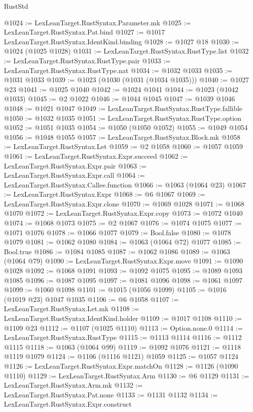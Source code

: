 \begin{lexlean}{RustStd}
\begin{coremodule}
@1024 := LexLeanTarget.RustSyntax.Parameter.mk
@1025 := LexLeanTarget.RustSyntax.Pat.bind
@1027 := @1017 LexLeanTarget.RustSyntax.IdentKind.binding
@1028 := @1027 @18
@1030 := @1024 (@1025 @1028)
@1031 := LexLeanTarget.RustSyntax.RustType.list
@1032 := LexLeanTarget.RustSyntax.RustType.pair
@1033 := LexLeanTarget.RustSyntax.RustType.nat
@1034 := @1032 @1033
@1035 := @1031 @1033
@1039 := @1023 (@1030 (@1031 (@1034 @1035)))
@1040 := @1027 @23
@1041 := @1025 @1040
@1042 := @1024 @1041
@1044 := @1023 (@1042 @1033)
@1045 := @2 @1022
@1046 := @1044 @1045
@1047 := @1039 @1046
@1048 := @1021 @1047
@1049 := LexLeanTarget.RustSyntax.RustType.fallible
@1050 := @1032 @1035
@1051 := LexLeanTarget.RustSyntax.RustType.option
@1052 := @1051 @1035
@1054 := @1050 (@1050 @1052)
@1055 := @1049 @1054
@1056 := @1048 @1055
@1057 := LexLeanTarget.RustSyntax.Block.mk
@1058 := LexLeanTarget.RustSyntax.Let
@1059 := @2 @1058
@1060 := @1057 @1059
@1061 := LexLeanTarget.RustSyntax.Expr.succeed
@1062 := LexLeanTarget.RustSyntax.Expr.pair
@1063 := LexLeanTarget.RustSyntax.Expr.call
@1064 := LexLeanTarget.RustSyntax.Callee.function
@1066 := @1063 (@1064 @23)
@1067 := LexLeanTarget.RustSyntax.Expr
@1068 := @6 @1067
@1069 := LexLeanTarget.RustSyntax.Expr.clone
@1070 := @1069 @1028
@1071 := @1068 @1070
@1072 := LexLeanTarget.RustSyntax.Expr.copy
@1073 := @1072 @1040
@1074 := @1068 @1073
@1075 := @2 @1067
@1076 := @1074 @1075
@1077 := @1071 @1076
@1078 := @1066 @1077
@1079 := Bool.false
@1080 := @1078 @1079
@1081 := @1062 @1080
@1084 := @1063 (@1064 @72) @1077
@1085 := Bool.true
@1086 := @1084 @1085
@1087 := @1062 @1086
@1089 := @1063 (@1064 @79)
@1090 := LexLeanTarget.RustSyntax.Expr.move
@1091 := @1090 @1028
@1092 := @1068 @1091
@1093 := @1092 @1075
@1095 := @1089 @1093 @1085
@1096 := @1087 @1095
@1097 := @1081 @1096
@1098 := @1061 @1097
@1099 := @1060 @1098
@1101 := @1015 (@1056 @1099)
@1105 := @1016 (@1019 @23) @1047 @1035
@1106 := @6 @1058
@1107 := LexLeanTarget.RustSyntax.Let.mk
@1108 := LexLeanTarget.RustSyntax.IdentKind.holder
@1109 := @1017 @1108
@1110 := @1109 @23
@1112 := @1107 (@1025 @1110)
@1113 := Option.none.{0}
@1114 := LexLeanTarget.RustSyntax.RustType
@1115 := @1113 @1114
@1116 := @1112 @1115
@1118 := @1063 (@1064 @99)
@1119 := @1092 @1076
@1121 := @1118 @1119 @1079
@1124 := @1106 (@1116 @1121) @1059
@1125 := @1057 @1124
@1126 := LexLeanTarget.RustSyntax.Expr.matchOn
@1128 := @1126 (@1090 @1110)
@1129 := LexLeanTarget.RustSyntax.Arm
@1130 := @6 @1129
@1131 := LexLeanTarget.RustSyntax.Arm.mk
@1132 := LexLeanTarget.RustSyntax.Pat.none
@1133 := @1131 @1132
@1134 := LexLeanTarget.RustSyntax.Expr.construct

\end{coremodule}
\end{lexlean}
